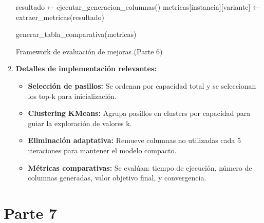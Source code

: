 \documentclass[a4paper,12pt]{article}
\begin{document}
\begin{enumerate}[label=(\alph*), leftmargin=2em]
\begin{algorithm}[H]
{{            resultado ← ejecutar\_generacion\_columnas()\;
            metricas[instancia][variante] ← extraer\_metricas(resultado)\;
        }
    }
    
    generar\_tabla\_comparativa(metricas)\;
    
    \caption{Framework de evaluación de mejoras (Parte 6)}
    \end{algorithm}

    \item \textbf{Detalles de implementación relevantes:}
    
    \begin{itemize}
        \item \textbf{Selección de pasillos:} Se ordenan por capacidad total y se seleccionan los top-k para inicialización.
        \item \textbf{Clustering KMeans:} Agrupa pasillos en clusters por capacidad para guiar la exploración de valores k.
        \item \textbf{Eliminación adaptativa:} Remueve columnas no utilizadas cada 5 iteraciones para mantener el modelo compacto.
        \item \textbf{Métricas comparativas:} Se evalúan: tiempo de ejecución, número de columnas generadas, valor objetivo final, y convergencia.
    \end{itemize}

\end{enumerate}

\clearpage

\section{Parte 7}
\end{document}
